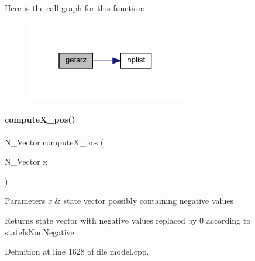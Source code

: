 Here is the call graph for this function\+:
\nopagebreak
\begin{figure}[H]
\begin{center}
\leavevmode
\includegraphics[width=199pt]{classamici_1_1_model_a49336e5923942fc5b4b26d6facf90b1d_cgraph}
\end{center}
\end{figure}
\mbox{\label{classamici_1_1_model_a0c06c5326bb82ceedba30171c122cb8a}} 
\paragraph{\texorpdfstring{computeX\_pos()}{computeX\_pos()}}
{\footnotesize\ttfamily N\+\_\+\+Vector compute\+X\+\_\+pos (\begin{DoxyParamCaption}\item[{N\+\_\+\+Vector}]{x }\end{DoxyParamCaption})\hspace{0.3cm}{\ttfamily [protected]}}


\begin{DoxyParams}{Parameters}
{\em x} & state vector possibly containing negative values \\
\hline
\end{DoxyParams}
\begin{DoxyReturn}{Returns}
state vector with negative values replaced by 0 according to state\+Is\+Non\+Negative 
\end{DoxyReturn}


Definition at line 1628 of file model.\+cpp.

